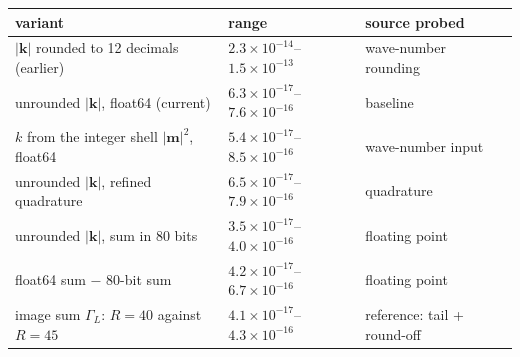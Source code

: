 \begin{tabular}{lll}
\toprule
variant & range & source probed \\
\midrule
$|\mathbf k|$ rounded to 12 decimals (earlier) & $2.3\times10^{-14}$--$1.5\times10^{-13}$ & wave-number rounding \\
unrounded $|\mathbf k|$, float64 (current) & $6.3\times10^{-17}$--$7.6\times10^{-16}$ & baseline \\
$k$ from the integer shell $|\mathbf m|^2$, float64 & $5.4\times10^{-17}$--$8.5\times10^{-16}$ & wave-number input \\
unrounded $|\mathbf k|$, refined quadrature & $6.5\times10^{-17}$--$7.9\times10^{-16}$ & quadrature \\
unrounded $|\mathbf k|$, sum in 80 bits & $3.5\times10^{-17}$--$4.0\times10^{-16}$ & floating point \\
float64 sum $-$ 80-bit sum & $4.2\times10^{-17}$--$6.7\times10^{-16}$ & floating point \\
image sum $\Gamma_L$: $R=40$ against $R=45$ & $4.1\times10^{-17}$--$4.3\times10^{-16}$ & reference: tail + round-off \\
\bottomrule
\end{tabular}
